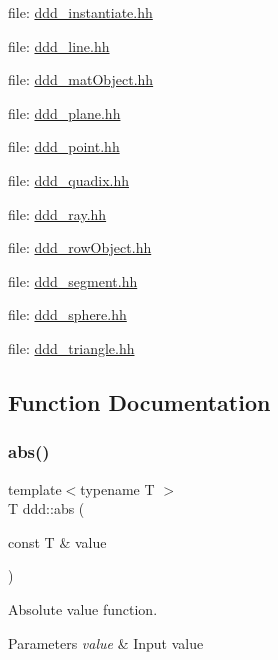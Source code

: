 file\+: \hyperlink{ddd__instantiate_8hh_source}{ddd\+\_\+instantiate.\+hh}

file\+: \hyperlink{ddd__line_8hh_source}{ddd\+\_\+line.\+hh}

file\+: \hyperlink{ddd__mat_object_8hh_source}{ddd\+\_\+mat\+Object.\+hh}

file\+: \hyperlink{ddd__plane_8hh_source}{ddd\+\_\+plane.\+hh}

file\+: \hyperlink{ddd__point_8hh_source}{ddd\+\_\+point.\+hh}

file\+: \hyperlink{ddd__quadix_8hh_source}{ddd\+\_\+quadix.\+hh}

file\+: \hyperlink{ddd__ray_8hh_source}{ddd\+\_\+ray.\+hh}

file\+: \hyperlink{ddd__row_object_8hh_source}{ddd\+\_\+row\+Object.\+hh}

file\+: \hyperlink{ddd__segment_8hh_source}{ddd\+\_\+segment.\+hh}

file\+: \hyperlink{ddd__sphere_8hh_source}{ddd\+\_\+sphere.\+hh}

file\+: \hyperlink{ddd__triangle_8hh_source}{ddd\+\_\+triangle.\+hh} 

\subsection{Function Documentation}
\mbox{\label{namespaceddd_a9ac20d4240d0a9fa208e3dd220101a0a}} 
\subsubsection{\texorpdfstring{abs()}{abs()}}
{\footnotesize\ttfamily template$<$typename T $>$ \\
T ddd\+::abs (\begin{DoxyParamCaption}\item[{const T \&}]{value }\end{DoxyParamCaption})\hspace{0.3cm}{\ttfamily [inline]}}



Absolute value function. 


\begin{DoxyParams}{Parameters}
{\em value} & Input value \\
\hline
\end{DoxyParams}
\mbox{\label{namespaceddd_a03e440b351f44fec5abac1270231e3bb}} 
